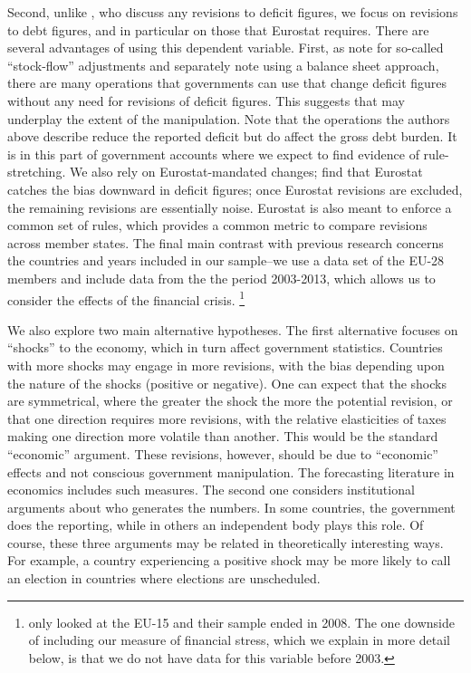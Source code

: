 \documentclass[]{article}
\begin{document}
Second, unlike \cite{DeCastro2013} , who discuss any revisions to deficit figures, we focus on  revisions to debt figures, and in particular on those that Eurostat requires. There are several advantages of using this dependent variable. First, as \cite{vonHagenWolff2006} note for so-called ``stock-flow'' adjustments and \cite{MilesiMoriyama2006}  separately note using a balance sheet approach, there are many operations that governments can use that change deficit figures without any need for revisions of deficit figures. This suggests that \cite{DeCastro2013} may underplay the extent of the manipulation. Note that the operations the authors above describe reduce the reported deficit but do affect the gross debt burden. It is in this part of government accounts where we expect to find evidence of rule-stretching. We also rely on Eurostat-mandated changes;  \cite{DeCastro2013} find that Eurostat catches the bias downward in deficit figures; once Eurostat revisions are excluded, the remaining revisions are essentially noise. Eurostat is also meant to enforce a common set of rules, which provides a common metric to compare revisions across member states. The final main contrast with previous research concerns the countries and years included in our sample--we use a data set of the EU-28 members and include data from the the period 2003-2013, which allows us to consider the effects of the financial crisis. \footnote{\cite{DeCastro2013} only looked at the EU-15 and their sample ended in 2008. The one downside of including our measure of financial stress, which we explain in more detail below, is that we do not have data for this variable before 2003.}

We also explore two main alternative hypotheses. The first alternative focuses on ``shocks'' to the economy, which in turn affect government statistics. Countries with more shocks may engage in more revisions, with the bias depending upon the nature of the shocks (positive or negative). One can expect that the shocks are symmetrical, where the greater the shock the more the potential revision, or that one direction requires more revisions, with  the relative elasticities of taxes making one direction more volatile than another. This would be the standard ``economic'' argument. These revisions, however, should be due to ``economic'' effects and not conscious government manipulation. The forecasting literature in economics includes such measures. The second one considers institutional arguments about who generates the numbers. In some countries, the government does the reporting, while in others an independent body plays this role. Of course, these three arguments may be related in theoretically interesting ways. For example, a country experiencing a positive shock may be more likely to call an election in countries where elections are unscheduled.
\end{document}
